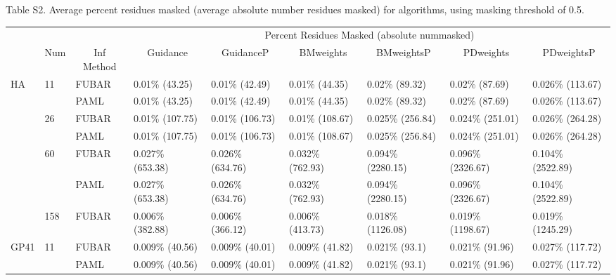 \documentclass[11pt]{article}
\begin{document}
\noindent Table S2. Average percent residues masked (average absolute number residues masked) for algorithms, using masking threshold of 0.5.
\begin{sidewaystable}[htbp]
\begin{adjustwidth}{-2.25cm}{}
\begin{tabular}{l l l l l l l l l}
\hline\noalign{\smallskip}
& & & \multicolumn{6}{c}{Percent Residues Masked (absolute nummasked)} \\
\cline{4-9}\noalign{\smallskip}
\multicolumn{1}{c}{Profile} & \multicolumn{1}{c}{Num} & \multicolumn{1}{c}{Inf Method} & \multicolumn{1}{c}{Guidance} & \multicolumn{1}{c}{GuidanceP} & \multicolumn{1}{c}{BMweights} & \multicolumn{1}{c}{BMweightsP} & \multicolumn{1}{c}{PDweights} & \multicolumn{1}{c}{PDweightsP} \\
\noalign{\smallskip}\hline\noalign{\smallskip}
HA  &  11  &  FUBAR  &  0.01\% (43.25)  &  0.01\% (42.49)  &  0.01\% (44.35)  &  0.02\% (89.32)  &  0.02\% (87.69)  &  0.026\% (113.67)  \\
  &    &  PAML  &  0.01\% (43.25)  &  0.01\% (42.49)  &  0.01\% (44.35)  &  0.02\% (89.32)  &  0.02\% (87.69)  &  0.026\% (113.67)  \\
 \hline
  &  26  &  FUBAR  &  0.01\% (107.75)  &  0.01\% (106.73)  &  0.01\% (108.67)  &  0.025\% (256.84)  &  0.024\% (251.01)  &  0.026\% (264.28)  \\
  &    &  PAML  &  0.01\% (107.75)  &  0.01\% (106.73)  &  0.01\% (108.67)  &  0.025\% (256.84)  &  0.024\% (251.01)  &  0.026\% (264.28)  \\
  \hline
   &  60  &  FUBAR  &  0.027\% (653.38)  &  0.026\% (634.76)  &  0.032\% (762.93)  &  0.094\% (2280.15)  &  0.096\% (2326.67)  &  0.104\% (2522.89)  \\
  &    &  PAML  &  0.027\% (653.38)  &  0.026\% (634.76)  &  0.032\% (762.93)  &  0.094\% (2280.15)  &  0.096\% (2326.67)  &  0.104\% (2522.89)  \\
 \hline
   &  158  &  FUBAR  &  0.006\% (382.88)  &  0.006\% (366.12)  &  0.006\% (413.73)  &  0.018\% (1126.08)  &  0.019\% (1198.67)  &  0.019\% (1245.29)  \\
 \hline
 GP41  &  11  &  FUBAR  &  0.009\% (40.56)  &  0.009\% (40.01)  &  0.009\% (41.82)  &  0.021\% (93.1)  &  0.021\% (91.96)  &  0.027\% (117.72)  \\
  &    &  PAML  &  0.009\% (40.56)  &  0.009\% (40.01)  &  0.009\% (41.82)  &  0.021\% (93.1)  &  0.021\% (91.96)  &  0.027\% (117.72)  \\

\end{tabular}
\end{adjustwidth}
\end{sidewaystable}
\end{document}
